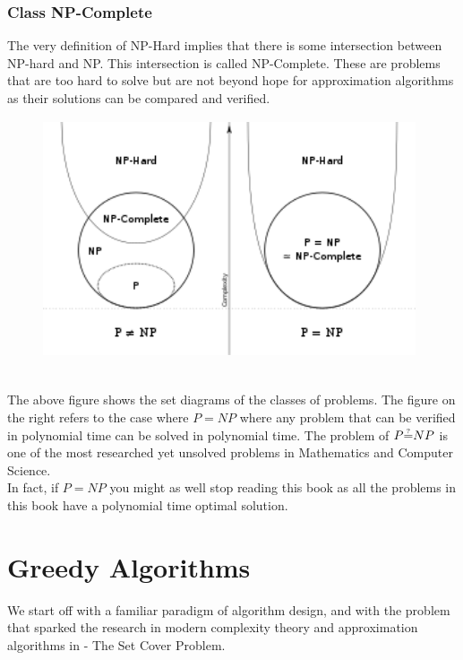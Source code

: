 \documentclass[12pt]{report}
\newcommand{\qeq}{\accentset{?}{=}}
\begin{document}
\subsection*{Class NP-Complete}
The very definition of NP-Hard implies that there is some intersection between NP-hard and NP. This intersection is called NP-Complete. These are problems that are too hard to solve but are not beyond hope for approximation algorithms as their solutions can be compared and verified. \\
\pagebreak
\begin{figure}[h]
\includegraphics[width=11cm, height=7cm]{np.jpg}
\centering
\end{figure}\\
The above figure shows the set diagrams of the classes of problems. The figure on the right refers to the case where $P=NP$ where any problem that can be verified in polynomial time can be solved in polynomial time. The problem of $P\qeq NP$ is one of the most researched yet unsolved problems in Mathematics and Computer Science. \\
In fact, if $P=NP$ you might as well stop reading this book as all the problems in this book have a polynomial time optimal solution. 

\chapter{Greedy Algorithms}
We start off with a familiar paradigm of algorithm design, and with the problem that sparked the research in modern complexity theory and approximation algorithms in - The Set Cover Problem.\\
\end{document}
